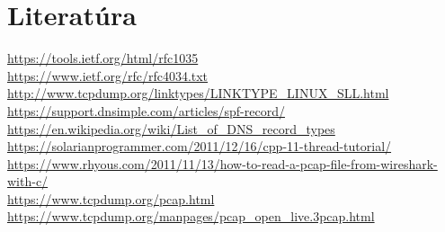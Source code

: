 \documentclass{article}
\begin{document}
    \section{Literatúra}
    \noindent
    \url{https://tools.ietf.org/html/rfc1035}\\
    \url{https://www.ietf.org/rfc/rfc4034.txt}\\
    \url{http://www.tcpdump.org/linktypes/LINKTYPE_LINUX_SLL.html}\\
    \url{https://support.dnsimple.com/articles/spf-record/}\\
    \url{https://en.wikipedia.org/wiki/List_of_DNS_record_types}\\
    \url{https://solarianprogrammer.com/2011/12/16/cpp-11-thread-tutorial/}\\
    \url{https://www.rhyous.com/2011/11/13/how-to-read-a-pcap-file-from-wireshark-with-c/}\\
    \url{https://www.tcpdump.org/pcap.html}\\
    \url{https://www.tcpdump.org/manpages/pcap_open_live.3pcap.html}\\
\end{document}
